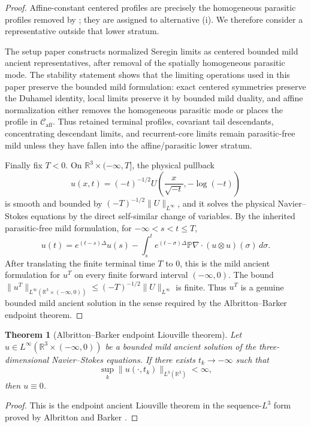\documentclass[11pt]{amsart}
\numberwithin{equation}{section}
\theoremstyle{plain}
\newtheorem{theorem}{Theorem}[section]
\theoremstyle{definition}
\theoremstyle{remark}
\newcommand{\R}{\mathbb R}
\newcommand{\Caff}{\mathcal C_{\mathrm{aff}}}
\begin{document}
\begin{proof}
Affine-constant centered profiles are precisely the homogeneous parasitic
profiles removed by ; they are assigned
to alternative (i).  We therefore consider a representative outside that lower
stratum.

The setup paper constructs normalized Seregin limits as centered bounded mild
ancient representatives, after removal of the spatially homogeneous parasitic
mode.  The stability statement
 shows that the limiting operations used
in this paper preserve the bounded mild formulation: exact centered symmetries
preserve the Duhamel identity, local limits preserve it by bounded mild duality,
and affine normalization either removes the homogeneous parasitic mode or places
the profile in \(\Caff\).  Thus retained terminal profiles, covariant tail
descendants, concentrating descendant limits, and recurrent-core limits remain
parasitic-free mild unless they have fallen into the affine/parasitic lower
stratum.

Finally fix \(T<0\).  On \(\R^3\times(-\infty,T]\), the physical pullback
\[
   u(x,t)=(-t)^{-1/2}
   U\!\left(\frac{x}{\sqrt{-t}},-\log(-t)\right)
\]
is smooth and bounded by \((-T)^{-1/2}\|U\|_{L^\infty}\), and it solves the
physical Navier--Stokes equations by the direct self-similar change of
variables.  By the inherited parasitic-free mild formulation, for
\(-\infty<s<t\le T\),
\[
   u(t)=e^{(t-s)\Delta}u(s)
   -\int_s^t e^{(t-\sigma)\Delta}
      \mathbb P\nabla\cdot(u\otimes u)(\sigma)\,d\sigma .
\]
After translating the finite terminal time \(T\) to \(0\), this is the mild
ancient formulation for \(u^T\) on every finite forward interval
\((-\infty,0)\).  The bound
\(\|u^T\|_{L^\infty(\mathbb R^3\times(-\infty,0))}
\le (-T)^{-1/2}\|U\|_{L^\infty}\) is finite.  Thus \(u^T\) is a genuine
bounded mild ancient solution in the sense required by the
Albritton--Barker endpoint theorem.
\end{proof}

\begin{theorem}[Albritton--Barker endpoint Liouville theorem]
\label{thm:AB-main}
Let \(u\in L^\infty(\mathbb R^3\times(-\infty,0))\) be a bounded mild ancient
solution of the three-dimensional Navier--Stokes equations.  If there exists
\(t_k\to-\infty\) such that
\[
   \sup_k\|u(\cdot,t_k)\|_{L^3(\R^3)}<\infty,
\]
then \(u\equiv0\).
\end{theorem}

\begin{proof}
This is the endpoint ancient Liouville theorem in the sequence-\(L^3\) form
proved by Albritton and Barker \cite{AlbrittonBarker2019}.
\end{proof}
\end{document}
